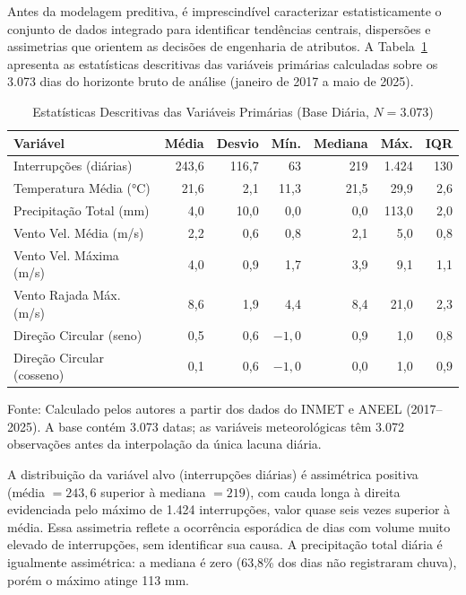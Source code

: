 Antes da modelagem preditiva, é imprescindível caracterizar estatisticamente o conjunto de dados integrado para identificar tendências centrais, dispersões e assimetrias que orientem as decisões de engenharia de atributos. A Tabela~\ref{tab:descritiva} apresenta as estatísticas descritivas das variáveis primárias calculadas sobre os 3.073 dias do horizonte bruto de análise (janeiro de 2017 a maio de 2025).

\begin{table}[H]
\caption{Estatísticas Descritivas das Variáveis Primárias (Base Diária, $N = 3.073$)}
\label{tab:descritiva}
\begin{center}
\small
\begin{tabular}{lrrrrrr}
\toprule
\textbf{Variável} & \textbf{Média} & \textbf{Desvio} & \textbf{Mín.} & \textbf{Mediana} & \textbf{Máx.} & \textbf{IQR} \\
\midrule
Interrupções (diárias) & 243,6 & 116,7 & 63 & 219 & 1.424 & 130 \\
Temperatura Média (°C) & 21,6 & 2,1 & 11,3 & 21,5 & 29,9 & 2,6 \\
Precipitação Total (mm) & 4,0 & 10,0 & 0,0 & 0,0 & 113,0 & 2,0 \\
Vento Vel. Média (m/s) & 2,2 & 0,6 & 0,8 & 2,1 & 5,0 & 0,8 \\
Vento Vel. Máxima (m/s) & 4,0 & 0,9 & 1,7 & 3,9 & 9,1 & 1,1 \\
Vento Rajada Máx. (m/s) & 8,6 & 1,9 & 4,4 & 8,4 & 21,0 & 2,3 \\
Direção Circular (seno) & 0,5 & 0,6 & $-1{,}0$ & 0,9 & 1,0 & 0,8 \\
Direção Circular (cosseno) & 0,1 & 0,6 & $-1{,}0$ & 0,0 & 1,0 & 0,9 \\
\bottomrule
\end{tabular}
\normalsize
\end{center}
\small{Fonte: Calculado pelos autores a partir dos dados do INMET e ANEEL (2017--2025). A base contém 3.073 datas; as variáveis meteorológicas têm 3.072 observações antes da interpolação da única lacuna diária.}
\end{table}

A distribuição da variável alvo (interrupções diárias) é assimétrica positiva (média $= 243{,}6$ superior à mediana $= 219$), com cauda longa à direita evidenciada pelo máximo de 1.424 interrupções, valor quase seis vezes superior à média. Essa assimetria reflete a ocorrência esporádica de dias com volume muito elevado de interrupções, sem identificar sua causa. A precipitação total diária é igualmente assimétrica: a mediana é zero (63,8\% dos dias não registraram chuva), porém o máximo atinge 113 mm.

